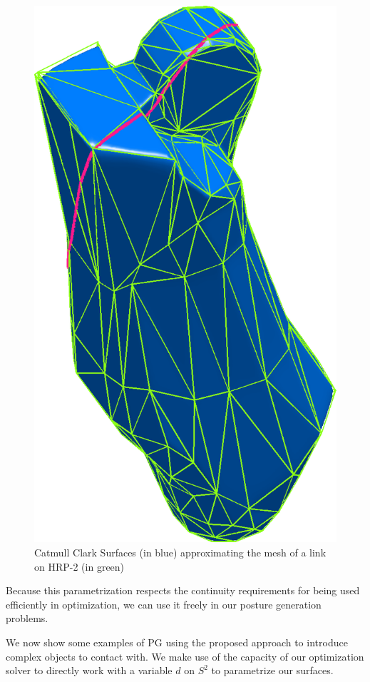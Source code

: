 \begin{figure}
    \includegraphics[width = 0.2\paperwidth]{leg3smoothSharp.png}
\caption{Catmull Clark Surfaces (in blue) approximating the mesh of a link on HRP-2 (in green)}
\label{fig:CCS}
\end{figure}

Because this parametrization respects the continuity requirements for being used efficiently in optimization, we can use it freely in our posture generation problems.

We now show some examples of PG using the proposed approach to introduce complex objects to contact with.
We make use of the capacity of our optimization solver to directly work with a variable $d$ on $S^2$ to parametrize our surfaces.


